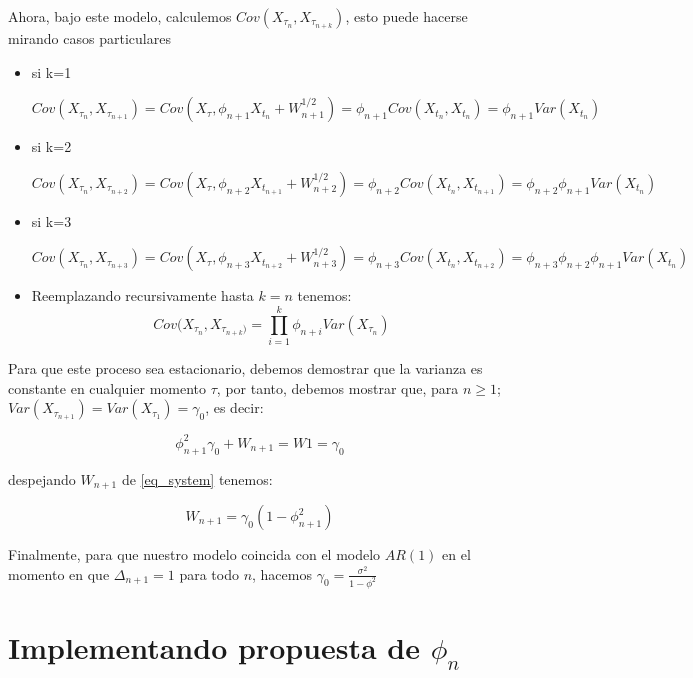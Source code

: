 Ahora, bajo este modelo, calculemos $Cov(X_{\tau_{n}}, X_{\tau_{n+k}})$, esto puede hacerse mirando casos particulares


\begin{itemize}
\item si k=1

$Cov(X_{\tau_n}, X_{\tau_{n+1}}) = Cov(X_{\tau}, \phi_{n+1} X_{t_n} +W_{n+1}^{1/2}) = \phi_{n+1} Cov(X_{t_n}, X_{t_n}) = \phi_{n+1} Var(X_{t_n}) $

\item si k=2

$Cov(X_{\tau_n}, X_{\tau_{n+2}}) = Cov(X_{\tau}, \phi_{n+2} X_{t_{n+1}} +W_{n+2}^{1/2}) = \phi_{n+2} Cov(X_{t_n}, X_{t_{n+1}}) = \phi_{n+2} \phi_{n+1} Var(X_{t_n})$

\item si k=3

$Cov(X_{\tau_n}, X_{\tau_{n+3}}) = Cov(X_{\tau}, \phi_{n+3} X_{t_{n+2}} +W_{n+3}^{1/2}) = \phi_{n+3} Cov(X_{t_n}, X_{t_{n+2}}) = \phi_{n+3}\phi_{n+2} \phi_{n+1} Var(X_{t_n})$

\item Reemplazando recursivamente hasta $k=n$ tenemos:
\begin{equation}
Cov(X_{\tau_n}, X_{\tau_{n+k})} = \displaystyle\prod_{i=1}^{k} \phi_{n+i}Var(X_{\tau_n})
\label{cov_propuesta}
\end{equation}

\end{itemize}

Para que este proceso sea estacionario, debemos demostrar que la varianza es constante en cualquier momento $\tau$, por tanto, debemos mostrar que, para $n \geq 1$; $Var(X_{\tau_{n+1}}) = Var(X_{\tau_1}) = \gamma_0$, es decir:

\begin{equation}
\phi_{n+1}^{2}\gamma_0 + W_{n+1} = W1 = \gamma_0
\label{eq_system}
\end{equation}

despejando $W_{n+1}$ de \ref{eq_system} tenemos:

\begin{equation}
W_{n+1} = \gamma_0 (1-\phi_{n+1}^2)
\label{eq:w}
\end{equation}

Finalmente, para que nuestro modelo coincida con el modelo $AR(1)$ en el momento en que $\Delta_{n+1}=1$ para todo $n$, hacemos $\gamma_0 = \frac{\sigma^2}{1-\phi^2}$

\section{Implementando propuesta de $\phi_n$}

